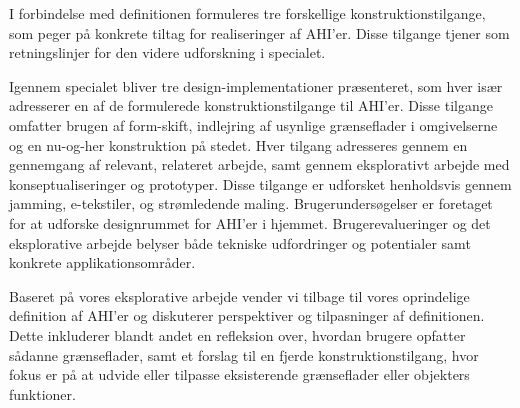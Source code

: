 I forbindelse med definitionen formuleres tre forskellige konstruktionstilgange, som peger på konkrete tiltag for realiseringer af AHI'er.
Disse tilgange tjener som retningslinjer for den videre udforskning i specialet.

Igennem specialet bliver tre design-implementationer præsenteret, som hver især adresserer en af de formulerede konstruktionstilgange til AHI'er.
Disse tilgange omfatter brugen af form-skift, indlejring af usynlige grænseflader i omgivelserne og en nu-og-her konstruktion på stedet.
Hver tilgang adresseres gennem en gennemgang af relevant, relateret arbejde, samt gennem eksplorativt arbejde med konseptualiseringer og prototyper.
Disse tilgange er udforsket henholdsvis gennem jamming, e-tekstiler, og strømledende maling.
Brugerundersøgelser er foretaget for at udforske designrummet for AHI'er i hjemmet.
Brugerevalueringer og det eksplorative arbejde belyser både tekniske udfordringer og potentialer samt konkrete applikationsområder.

Baseret på vores eksplorative arbejde vender vi tilbage til vores oprindelige definition af AHI'er og diskuterer perspektiver og tilpasninger af definitionen.
Dette inkluderer blandt andet en refleksion over, hvordan brugere opfatter sådanne grænseflader, samt et forslag til en fjerde konstruktionstilgang, hvor fokus er på at udvide eller tilpasse eksisterende grænseflader eller objekters funktioner.

